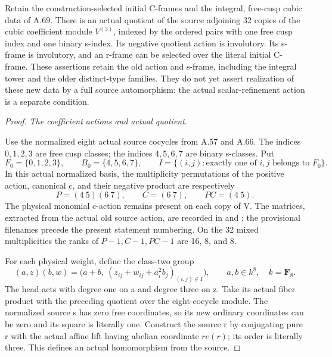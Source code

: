 Retain the construction-selected initial C-frames and the integral,
free-cusp cubic data of A.69. There is an actual quotient of the source
adjoining 32 copies of the cubic coefficient module \(V^{(3)}\), indexed
by the ordered pairs with one free cusp index and one binary s-index.
Its negative quotient action is involutory. Its s-frame is involutory,
and an r-frame can be selected over the literal initial C-frame.
These assertions retain the old action and s-frame, including the
integral tower and the older distinct-type families. They do not yet
assert realization of these new data by a full source automorphism:
the actual scalar-refinement action is a separate condition.

\begin{proof}
\emph{The coefficient actions and actual quotient.}\par
Use the normalized eight actual source cocycles from A.57 and A.66.
The indices \(0,1,2,3\) are free cusp classes; the indices
\(4,5,6,7\) are binary s-classes. Put
\[
 F_0=\{0,1,2,3\},\qquad B_0=\{4,5,6,7\},\qquad
 I=\{(i,j):\text{exactly one of }i,j\text{ belongs to }F_0\}.
 \tag{A.72.1}
\]
In this actual normalized basis, the multiplicity permutations of the
positive action, canonical c, and their negative product are respectively
\[
 P=(4\ 5)(6\ 7),\qquad C=(6\ 7),\qquad PC=(4\ 5).
 \tag{A.72.2}
\]
The physical monomial c-action remains present on each copy of V.
The matrices, extracted from the actual old source action, are recorded
in  and
; the provisional
filenames precede the present statement numbering. On the 32 mixed
multiplicities the ranks of \(P-1,C-1,PC-1\) are 16, 8, and 8.

For each physical weight, define the class-two group
\[
 (a,z)(b,w)=
 \bigl(a+b,\ (z_{ij}+w_{ij}+a_i^2b_j)_{(i,j)\in I}\bigr),
 \qquad a,b\in k^8,\quad k=\mathbf F_8.
 \tag{A.72.3}
\]
The head acts with degree one on a and degree three on z. Take its
actual fiber product with the preceding quotient over the eight-cocycle
module. The normalized source s has zero free coordinates, so its new
ordinary coordinates can be zero and its square is literally one.
Construct the source r by conjugating pure r with the actual affine
lift having abelian coordinate \(r e(r)\); its order is literally three.
This defines an actual homomorphism from the source.


\end{proof}
